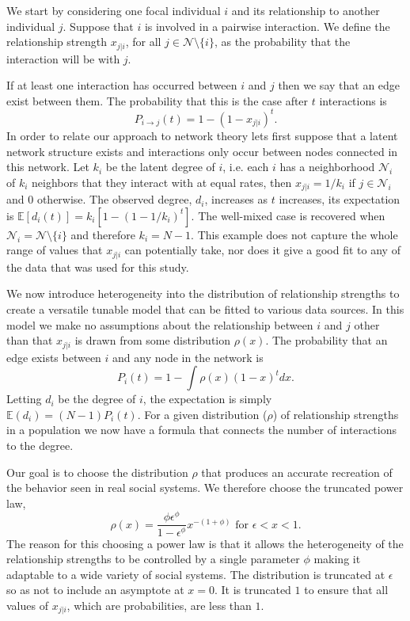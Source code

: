 \documentclass[10pt]{article}
\begin{document}
\begin{multicols}{2}
We start by considering one focal individual $i$ and its relationship to another individual $j$. Suppose that $i$ is involved in a pairwise interaction. We define the relationship strength $x_{j|i}$, for all $j\in \mathcal{N}\setminus\{i\}$, as the probability that the interaction will be with $j$.
 
If at least one interaction has occurred between $i$ and $j$ then we say that an edge exist between them. The probability that this is the case after $t$ interactions is
\begin{equation}
\label{i_to_j}
P_{i \rightarrow j}(t)=1-(1-x_{j|i})^{t}.
\end{equation}
In order to relate our approach to network theory lets first suppose that a latent network structure exists and interactions only occur between nodes connected in this network. Let $k_{i}$ be the latent degree of $i$, i.e. each $i$ has a neighborhood $\mathcal{N}_{i}$ of $k_{i}$ neighbors that they interact with at equal rates, then $x_{j|i}=1/k_{i}$ if $j\in\mathcal{N}_{i}$ and $0$ otherwise. The observed degree, $d_{i}$, increases as $t$ increases, its expectation is $\mathbb{E}[d_{i}(t)]=k_{i}[1-(1-1/k_{i})^{t}]$. The well-mixed case is recovered when $\mathcal{N}_{i}=\mathcal{N}\setminus\{i\}$ and therefore $k_{i}=N-1$. This example does not capture the whole range of values that $x_{j|i}$ can potentially take, nor does it give a good fit to any of the data that was used for this study.

We now introduce heterogeneity into the distribution of relationship strengths to create a versatile tunable model that can be fitted to various data sources. In this model we make no assumptions about the relationship between $i$ and $j$ other than that $x_{j|i}$ is drawn from some distribution $\rho(x)$. The probability that an edge exists between $i$ and any node in the network is
\begin{equation}
\label{i_to_any}
P_{i}(t)=1-\int\rho(x)(1-x)^{t}dx.
\end{equation}
Letting $d_{i}$ be the degree of $i$, the expectation is simply $\mathbb{E}(d_{i})=(N-1)P_{i}(t)$. For a given distribution ($\rho$) of relationship strengths in a population we now have a formula that connects the number of interactions to the degree.

Our goal is to choose the distribution $\rho$ that produces an accurate recreation of the behavior seen in real social systems. We therefore choose the truncated power law,
\begin{equation}
\label{distribution}
\rho(x)=\frac{\phi\epsilon^{\phi}}{1-\epsilon^{\phi}}x^{-(1+\phi)} \text{ for } \epsilon<x<1.
\end{equation}
The reason for this choosing a power law is that it allows the heterogeneity of the relationship strengths to be controlled by a single parameter $\phi$ making it adaptable to a wide variety of social systems. The distribution is truncated at $\epsilon$ so as not to include an asymptote at $x=0$. It is truncated $1$ to ensure that all values of $x_{j|i}$, which are probabilities, are less than $1$.


\end{multicols}
\end{document}
